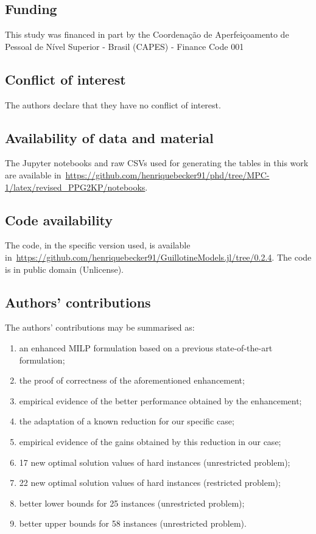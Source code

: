 \documentclass[smallextended]{svjour3}       %
\begin{document}
\subsection*{Funding}
This study was financed in part by the Coordenação de Aperfeiçoamento de Pessoal de Nível Superior - Brasil (CAPES) - Finance Code 001
\subsection*{Conflict of interest}
The authors declare that they have no conflict of interest.
\subsection*{Availability of data and material}
The Jupyter notebooks and raw CSVs used for generating the tables in this work are available in~\url{https://github.com/henriquebecker91/phd/tree/MPC-1/latex/revised_PPG2KP/notebooks}.
\subsection*{Code availability}
The code, in the specific version used, is available in~\url{https://github.com/henriquebecker91/GuillotineModels.jl/tree/0.2.4}. The code is in public domain (Unlicense).
\subsection*{Authors' contributions}
The authors' contributions may be summarised as:
\begin{enumerate}
\item an enhanced MILP formulation based on a previous state-of-the-art formulation;
\item the proof of correctness of the aforementioned enhancement;
\item empirical evidence of the better performance obtained by the enhancement;
\item the adaptation of a known reduction for our specific case;
\item empirical evidence of the gains obtained by this reduction in our case;
\item 17 new optimal solution values of hard instances (unrestricted problem);
\item 22 new optimal solution values of hard instances (restricted problem);
\item better lower bounds for 25 instances (unrestricted problem);
\item better upper bounds for 58 instances (unrestricted problem).
\end{enumerate}

\end{document}
